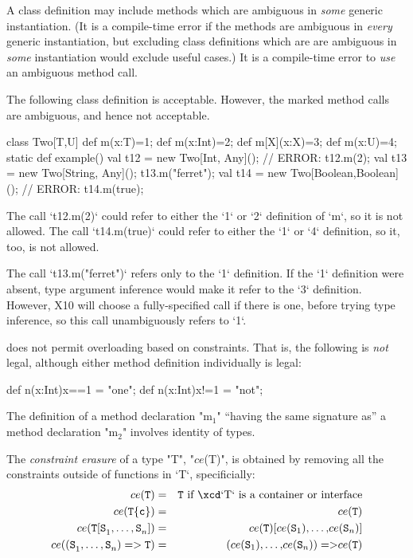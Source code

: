 A class definition may include methods which are ambiguous in {\em some}
generic instantiation. (It is a compile-time error if the methods are
ambiguous in {\em every} generic instantiation, but excluding class
definitions which are are ambiguous in {\em some} instantiation would exclude
useful cases.)  It is a compile-time error to {\em use} an ambiguous method
call. 

\begin{ex}
The following class definition is acceptable.  However, the marked method
calls are ambiguous, and hence not acceptable.
\begin{xten}
class Two[T,U]{
  def m(x:T)=1;
  def m(x:Int)=2;
  def m[X](x:X)=3;
  def m(x:U)=4;
  static def example() {
    val t12 = new Two[Int, Any]();
    // ERROR: t12.m(2);
    val t13  = new Two[String, Any]();
    t13.m("ferret");
    val t14 = new Two[Boolean,Boolean]();
    // ERROR: t14.m(true);
  }
}
\end{xten}
\noindent
The call \xcd`t12.m(2)` could refer to either the \xcd`1` or \xcd`2`
definition of \xcd`m`, so it is not allowed.   
The call \xcd`t14.m(true)` could refer to either the \xcd`1` or \xcd`4`
definition, so it, too, is not allowed.

The call \xcd`t13.m("ferret")` refers only to the \xcd`1` definition.  If
the \xcd`1` definition were absent, type argument inference would make it
refer to the \xcd`3` definition.  However, X10 will choose a fully-specified
call if there is one, before trying type inference, so this call unambiguously
refers to \xcd`1`.
\end{ex}


\XtenCurrVer{} does not permit overloading based on constraints. That is, the
following is {\em not} legal, although either method definition individually
is legal:
\begin{xten}
   def n(x:Int){x==1} = "one";
   def n(x:Int){x!=1} = "not";
\end{xten}




The definition of a method declaration \xcdmath"m$_1$" ``having the same signature
as'' a method declaration \xcdmath"m$_2$" involves identity of types. 



The {\em constraint erasure} of a type \xcdmath"T", 
\xcdmath"$ce$(T)",
is obtained by removing all the constraints outside of functions in \xcd`T`,
specificially: 
\begin{eqnarray}
ce({\tt T}) &=& {\tt T} \mbox{ if \xcd`T` is a container or interface}\\
ce({\tt T\{c\}}) &=& ce({\tt T})\\
ce({\tt T[S}_1{\tt,}\ldots{\tt,S}_n{\tt ]})
  &=&
ce({\tt T}){\tt [} ce({\tt S}_1){\tt,}\ldots{\tt,} ce({\tt S}_n){\tt ]}\\
ce({\tt (S}_1{\tt,}\ldots{\tt,S}_n{\tt ) => T})
  &=&
{\tt }{\tt (} ce({\tt S}_1){\tt,}\ldots{\tt,} ce({\tt S}_n){\tt ) => } 
ce({\tt T})
\end{eqnarray}



